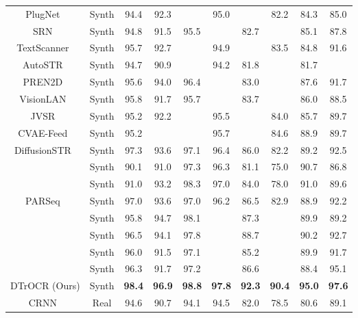 \documentclass[10pt,twocolumn,letterpaper]{article}
\begin{document}
\begin{table*}[tb]
\begin{tabular}{cccccccccc}
PlugNet~\cite{mou2020plugnet} & Synth &94.4 & 92.3 &  & 95.0 &  & 82.2 & 84.3 & 85.0 \\ 
SRN~\cite{yu2020srn} & Synth &94.8 & 91.5 & 95.5 &  & 82.7 &  & 85.1 & 87.8 \\ 
TextScanner~\cite{wan2020textscanner} & Synth &95.7 & 92.7 &  & 94.9 &  & 83.5 & 84.8 & 91.6 \\ 
AutoSTR~\cite{zhang2020autostr} & Synth &94.7 & 90.9 &  & 94.2 & 81.8 &  & 81.7 &  \\ 
PREN2D~\cite{yan2021pren2d} & Synth &95.6 & 94.0 & 96.4 &  & 83.0 &  & 87.6 & 91.7 \\ 
VisionLAN~\cite{wang2021visionlan} & Synth &95.8 & 91.7 & 95.7 &  & 83.7 &  & 86.0 & 88.5 \\ 
JVSR~\cite{bhunia2021joint} & Synth &95.2 & 92.2 &  & 95.5 &  & 84.0 & 85.7 & 89.7 \\ 
CVAE-Feed~\cite{bhunia2021towards} &Synth & 95.2 &  &  & 95.7 &  & 84.6 & 88.9 & 89.7 \\
DiffusionSTR~\cite{fujitake2023diffusionstr} & Synth & 97.3 & 93.6 & 97.1 & 96.4 & 86.0 & 82.2 & 89.2 & 92.5 \\

~\cite{li2021trocr} & Synth & 90.1 & 91.0 & 97.3 & 96.3 & 81.1 & 75.0 & 90.7 & 86.8  \\
~\cite{li2021trocr} & Synth & 91.0 & 93.2 & 98.3 & 97.0 & 84.0 & 78.0 & 91.0 & 89.6  \\

PARSeq~\cite{bautista2022parseq} & Synth& 97.0 & 93.6 & 97.0 & 96.2 & 86.5 & 82.9 & 88.9 & 92.2 \\
~\cite{lyu2022maskocr} & Synth & 95.8 & 94.7 & 98.1 &  & 87.3 &  & 89.9 & 89.2 \\
~\cite{lyu2022maskocr} & Synth& 96.5 & 94.1 & 97.8 &  & 88.7 &  & 90.2 & 92.7 \\

~\cite{du2022svtr} & Synth & 96.0 & 91.5 & 97.1 &  & 85.2 &  & 89.9 & 91.7  \\
~\cite{du2022svtr} & Synth & 96.3 & 91.7 & 97.2 &  & 86.6 &  & 88.4 & 95.1  \\


DTrOCR (Ours) & Synth & \textbf{98.4} & \textbf{96.9} & \textbf{98.8} & \textbf{97.8} & \textbf{92.3} & \textbf{90.4} & \textbf{95.0} & \textbf{97.6} \\
\hline
\hline
CRNN~\cite{shi2016crnn, bautista2022parseq} & Real &94.6 & 90.7 & 94.1 & 94.5 & 82.0 & 78.5 & 80.6 & 89.1 \\ 


\end{tabular}
\end{table*}
\end{document}

